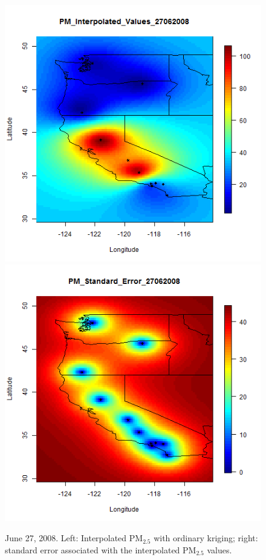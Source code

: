 \documentclass[10pt]{article}
\begin{document}
\begin{figure}[H]
\centering
  \includegraphics[width=.45\textwidth]{Interpolated_PM2008_0179.png}
  \includegraphics[width= .45\textwidth]{Standard_Error_PM2008_0179.png}
\caption{June 27, 2008.  Left: Interpolated PM$_{2.5}$ with ordinary kriging; right:
standard error associated with the interpolated PM$_{2.5}$ values.}
\label{june27}
\label{june27:sub2}
\end{figure}
\end{document}
